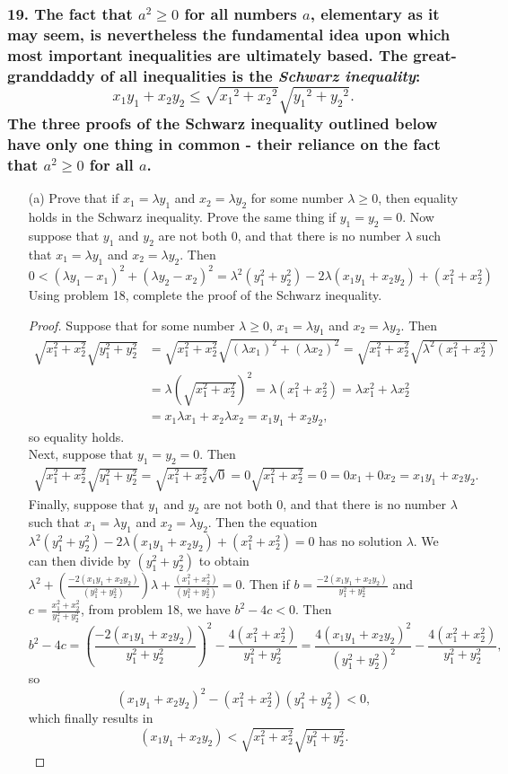 \documentclass{article}
\begin{document}
\subsubsection*{19. The fact that $a^2 \ge 0$ for all numbers $a$, elementary as it may seem, is nevertheless the fundamental idea upon which most important inequalities are ultimately based. The great-granddaddy of all inequalities is the \textit{Schwarz inequality}: \[x_1y_1 + x_2y_2 \le \sqrt{{x_1}^2 + {x_2}^2}\sqrt{{y_1}^2 + {y_2}^2}.\] The three proofs of the Schwarz inequality outlined below have only one thing in common - their reliance on the fact that $a^2 \ge 0$ for all $a$.}
\begin{enumerate}
	\item[(a)] Prove that if $x_1 = \lambda y_1$ and $x_2 = \lambda y_2$ for some number $\lambda \ge 0$, then equality holds in the Schwarz inequality. Prove the same thing if $y_1 = y_2 = 0$. Now suppose that $y_1$ and $y_2$ are not both 0, and that there is no number $\lambda$ such that $x_1 = \lambda y_1$ and $x_2 = \lambda y_2$. Then \[0 < (\lambda y_1 - x_1)^2 + (\lambda y_2 - x_2)^2 = \lambda^2(y_1^2 + y_2^2) - 2\lambda (x_1y_1 + x_2y_2) + (x_1^2 + x_2^2)\] Using problem 18, complete the proof of the Schwarz inequality.
	\begin{proof}
		Suppose that for some number $\lambda \ge 0$, $x_1 = \lambda y_1$ and $x_2 = \lambda y_2$. Then
		\begin{align*}
			\sqrt{x_1^2 + x_2^2}\sqrt{y_1^2 + y_2^2} &= \sqrt{x_1^2 + x_2^2}\sqrt{(\lambda x_1)^2 + (\lambda x_2)^2} = \sqrt{x_1^2 + x_2^2}\sqrt{\lambda^2(x_1^2 + x_2^2)} \\&= \lambda (\sqrt{x_1^2 + x_2^2})^2 = \lambda(x_1^2 + x_2^2) = \lambda x_1^2 + \lambda x_2^2 \\&= x_1\lambda x_1 + x_2\lambda x_2 = x_1y_1 + x_2y_2,
		\end{align*}
		so equality holds.
		\\Next, suppose that $y_1 = y_2 = 0$. Then
		\begin{align*}
			\sqrt{x_1^2 + x_2^2}\sqrt{y_1^2 + y_2^2} = \sqrt{x_1^2 + x_2^2}\sqrt{0} = 0\sqrt{x_1^2 + x_2^2} = 0 = 0x_1 + 0x_2 = x_1y_1 + x_2y_2.
		\end{align*}
		Finally, suppose that $y_1$ and $y_2$ are not both 0, and that there is no number $\lambda$ such that $x_1 = \lambda y_1$ and $x_2 = \lambda y_2$. Then the equation $\lambda^2(y_1^2 + y_2^2) - 2\lambda(x_1y_1 + x_2y_2) + (x_1^2 + x_2^2) = 0$ has no solution $\lambda$. We can then divide by $(y_1^2 + y_2^2)$ to obtain $\lambda^2 + (\frac{-2(x_1y_1 + x_2y_2)}{(y_1^2 + y_2^2)})\lambda + \frac{(x_1^2 + x_2^2)}{(y_1^2 + y_2^2)} = 0$. Then if $b = \frac{-2(x_1y_1 + x_2y_2)}{y_1^2 + y_2^2}$ and $c = \frac{x_1^2 + x_2^2}{y_1^2 + y_2^2}$, from problem 18, we have $b^2 - 4c < 0$. Then \[ b^2 - 4c = (\frac{-2(x_1y_1 + x_2y_2)}{y_1^2 + y_2^2})^2 - \frac{4(x_1^2 + x_2^2)}{y_1^2 + y_2^2} = \frac{4(x_1y_1 + x_2y_2)^2}{(y_1^2 + y_2^2)^2} - \frac{4(x_1^2 + x_2^2)}{y_1^2 + y_2^2}, \] so \[(x_1y_1 + x_2y_2)^2 - (x_1^2 + x_2^2)(y_1^2 + y_2^2) < 0,\] which finally results in \[(x_1y_1 + x_2y_2) < \sqrt{x_1^2 + x_2^2}\sqrt{y_1^2 + y_2^2}.\]

\end{proof}
\end{enumerate}
\end{document}

